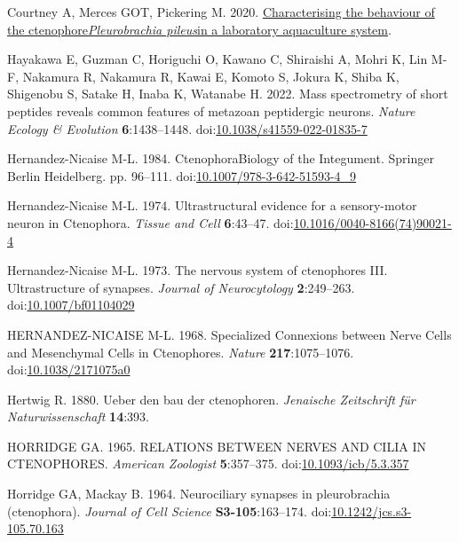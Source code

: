 \documentclass[
  11pt,
]{article}
\newlength{\cslhangindent}
\newenvironment{CSLReferences}[2] %
 {\begin{list}{}{%
  \setlength{\itemindent}{0pt}
  \setlength{\leftmargin}{0pt}
  \setlength{\parsep}{0pt}
  \ifodd #1
   \setlength{\leftmargin}{\cslhangindent}
   \setlength{\itemindent}{-1\cslhangindent}
  \fi
  \setlength{\itemsep}{#2\baselineskip}}}
 {\end{list}}
\begin{document}
\begin{CSLReferences}{1}{0}
Courtney A, Merces GOT, Pickering M. 2020.
\href{http://dx.doi.org/10.1101/2020.05.25.114744}{Characterising the
behaviour of the ctenophore{\emph{Pleurobrachia pileus}}in a laboratory
aquaculture system}.

Hayakawa E, Guzman C, Horiguchi O, Kawano C, Shiraishi A, Mohri K, Lin
M-F, Nakamura R, Nakamura R, Kawai E, Komoto S, Jokura K, Shiba K,
Shigenobu S, Satake H, Inaba K, Watanabe H. 2022. Mass spectrometry of
short peptides reveals common features of metazoan peptidergic neurons.
\emph{Nature Ecology \& Evolution} \textbf{6}:1438--1448.
doi:\href{https://doi.org/10.1038/s41559-022-01835-7}{10.1038/s41559-022-01835-7}

Hernandez-Nicaise M-L. 1984. CtenophoraBiology of the Integument.
Springer Berlin Heidelberg. pp. 96--111.
doi:\href{https://doi.org/10.1007/978-3-642-51593-4_9}{10.1007/978-3-642-51593-4\_9}

Hernandez-Nicaise M-L. 1974. Ultrastructural evidence for a
sensory-motor neuron in Ctenophora. \emph{Tissue and Cell}
\textbf{6}:43--47.
doi:\href{https://doi.org/10.1016/0040-8166(74)90021-4}{10.1016/0040-8166(74)90021-4}

Hernandez-Nicaise M-L. 1973. The nervous system of ctenophores III.
Ultrastructure of synapses. \emph{Journal of Neurocytology}
\textbf{2}:249--263.
doi:\href{https://doi.org/10.1007/bf01104029}{10.1007/bf01104029}

HERNANDEZ-NICAISE M-L. 1968. Specialized Connexions between Nerve Cells
and Mesenchymal Cells in Ctenophores. \emph{Nature}
\textbf{217}:1075--1076.
doi:\href{https://doi.org/10.1038/2171075a0}{10.1038/2171075a0}

Hertwig R. 1880. Ueber den bau der ctenophoren. \emph{Jenaische
Zeitschrift f{ü}r Naturwissenschaft} \textbf{14}:393.

HORRIDGE GA. 1965. RELATIONS BETWEEN NERVES AND CILIA IN CTENOPHORES.
\emph{American Zoologist} \textbf{5}:357--375.
doi:\href{https://doi.org/10.1093/icb/5.3.357}{10.1093/icb/5.3.357}

Horridge GA, Mackay B. 1964. Neurociliary synapses in pleurobrachia
(ctenophora). \emph{Journal of Cell Science} \textbf{S3-105}:163--174.
doi:\href{https://doi.org/10.1242/jcs.s3-105.70.163}{10.1242/jcs.s3-105.70.163}


\end{CSLReferences}
\end{document}
